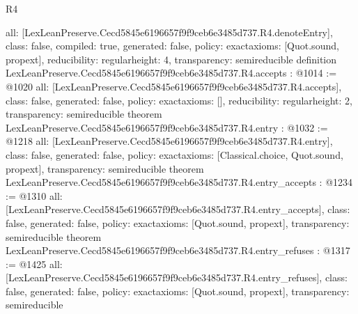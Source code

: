 \begin{lexlean}{R4}
\begin{coremodule}
{  all: [LexLeanPreserve.Cecd5845e6196657f9f9ceb6e3485d737.R4.denoteEntry],
  class: false,
  compiled: true,
  generated: false,
  policy: exact{axioms: [Quot.sound, propext]},
  reducibility: regular{height: 4},
  transparency: semireducible
}
definition LexLeanPreserve.Cecd5845e6196657f9f9ceb6e3485d737.R4.accepts : @1014 := @1020 {
  all: [LexLeanPreserve.Cecd5845e6196657f9f9ceb6e3485d737.R4.accepts],
  class: false,
  generated: false,
  policy: exact{axioms: []},
  reducibility: regular{height: 2},
  transparency: semireducible
}
theorem LexLeanPreserve.Cecd5845e6196657f9f9ceb6e3485d737.R4.entry : @1032 := @1218 {
  all: [LexLeanPreserve.Cecd5845e6196657f9f9ceb6e3485d737.R4.entry],
  class: false,
  generated: false,
  policy: exact{axioms: [Classical.choice, Quot.sound, propext]},
  transparency: semireducible
}
theorem LexLeanPreserve.Cecd5845e6196657f9f9ceb6e3485d737.R4.entry_accepts : @1234 := @1310 {
  all: [LexLeanPreserve.Cecd5845e6196657f9f9ceb6e3485d737.R4.entry_accepts],
  class: false,
  generated: false,
  policy: exact{axioms: [Quot.sound, propext]},
  transparency: semireducible
}
theorem LexLeanPreserve.Cecd5845e6196657f9f9ceb6e3485d737.R4.entry_refuses : @1317 := @1425 {
  all: [LexLeanPreserve.Cecd5845e6196657f9f9ceb6e3485d737.R4.entry_refuses],
  class: false,
  generated: false,
  policy: exact{axioms: [Quot.sound, propext]},
  transparency: semireducible
}


\end{coremodule}
\end{lexlean}
